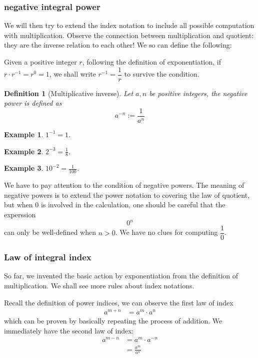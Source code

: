 \documentclass[12pt]{article}
\newtheorem{definition}{Definition}[section]
\newtheorem*{example}{Example}
\begin{document}
    \subsubsection*{negative integral power}

    We will then try to extend the index notation to include all possible computation with multiplication. Observe the connection between multiplication and quotient: they are the inverse relation to each other! We so can define the following:

    Given a positive integer $r$, following the definition of exponentiation, if $r\cdot r^{-1} = r^0 = 1$, we shall write $r^{-1}=\dfrac{1}{r}$ to survive the condition.

    \begin{definition}[Multiplicative inverse]
        Let $a, n$ be positive integers, the negative power is defined as $$a^{-n} := \frac{1}{a^n}$$
    \end{definition}

    \begin{example}
        $1^{-1}=1$.
    \end{example}

    \begin{example}
        $2^{-3}=\frac{1}{8}$.
    \end{example}

    \begin{example}
        $10^{-2}=\frac{1}{100}$.
    \end{example}

    We have to pay attention to the condition of negative powers. The meaning of negative powers is to extend the power notation to covering the law of quotient, but when 0 is involved in the calculation, one should be careful that the experssion $$0^n$$ can only be well-defined when $n>0$. We have no clues for computing $\dfrac{1}{0}$.

    \subsubsection*{Law of integral index}

    So far, we invented the basic action by exponentiation from the definition of multiplication. We shall see more rules about index notations.

    Recall the definition of power indices, we can observe the first law of index \begin{align*}
        a^{m+n}&=a^m \cdot a^n
    \end{align*} which can be proven by basically repeating the process of addition. We immediately have the second law of index:\begin{align*}
        a^{m-n}&=a^m\cdot a^{-n}\\
        &=\frac{a^m}{a^n}
    \end{align*}
\end{document}
